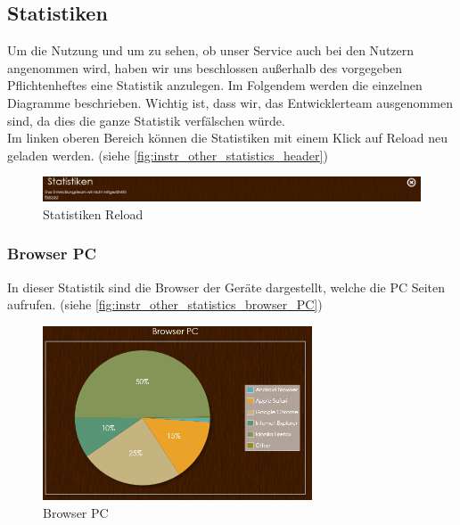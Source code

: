 \subsection{Statistiken}
Um die Nutzung und um zu sehen, ob unser Service auch bei den Nutzern angenommen wird, haben wir uns beschlossen außerhalb des vorgegeben Pflichtenheftes eine Statistik anzulegen. Im Folgendem werden die einzelnen Diagramme beschrieben. Wichtig ist, dass wir, das Entwicklerteam ausgenommen sind, da dies die ganze Statistik verfälschen würde.\\
Im linken oberen Bereich können die Statistiken mit einem Klick auf Reload neu geladen werden. (siehe \autoref{fig:instr_other_statistics_header})
\begin{figure}[H]
\centering
\includegraphics[keepaspectratio=true, width=17cm]{images/screenshots/statistics_header.png}
\caption{Statistiken Reload}
\label{fig:instr_other_statistics_header}
\end{figure}
\subsubsection{Browser PC}
In dieser Statistik sind die Browser der Geräte dargestellt, welche die PC Seiten aufrufen. (siehe \autoref{fig:instr_other_statistics_browser_PC})
\begin{figure}[H]
\centering
\includegraphics[keepaspectratio=true, width=8cm]{images/screenshots/statistics_browser_PC.png}
\caption{Browser PC}
\label{fig:instr_other_statistics_browser_PC}
\end{figure}
